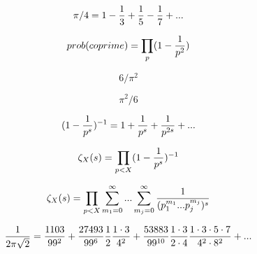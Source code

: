 

\setlength{\textwidth}{6.5in}
\setlength{\textheight}{9in}

\setlength{\topmargin}{-.75in}

\setlength{\evensidemargin}{0in}
\setlength{\oddsidemargin}{0in}
\newcommand{\rrr}{I\!\!R}
\newcommand{\R}[1]{$(\ref{#1})$}
\newcommand{\F}[1]{\ref{#1}}


\begin{equation}
\pi/4 = 1 - {1 \over 3} + {1 \over 5} - {1 \over 7} + ...
\end{equation}

\begin{equation}
prob(coprime) = \prod_p (1- {1 \over {p^2}} )
\end{equation}

\begin{equation}
6/\pi^2
\end{equation}

\begin{equation}
\pi^2 / 6
\end{equation}


\begin{equation}
(1- {1 \over {p^s}} )^{-1} = 1 + {1 \over p^{s}} + {1 \over p^{2s}} + ...
\end{equation}

\begin{equation}
\zeta_X(s) = \prod_{p < X} (1- {1 \over {p^s}} )^{-1}
\end{equation}

\begin{equation}
\zeta_X(s) = \prod_{p < X} \sum_{m_1=0}^{\infty} ... \sum_{m_j=0}^{\infty} {1 \over
(p_1^{m_1} ... p_j^{m_j})^s }
\end{equation}

\begin{equation}
{1 \over {2 \pi \sqrt 2}} = 
{1103 \over {99^2}} +
{27493 \over {99^6}} {1 \over 2} {{1 \cdot 3} \over {4^2}} +
{53883 \over {99^{10}}} {{1 \cdot 3} \over {2 \cdot 4}} {{1 \cdot 3 \cdot 5 \cdot 7} \over {4^2 \cdot 8^2}} + ...
\end{equation}


